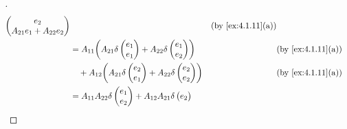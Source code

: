 \begin{proof}[]
\begin{align*}
\begin{pmatrix}
                                                                e_2 \\
                                                                A_{2 1} e_1 + A_{2 2} e_2
                                                              \end{pmatrix}             &  & \text{(by \cref{ex:4.1.11}(a))}                \\
              & = A_{1 1} \pa{A_{2 1} \delta\begin{pmatrix}
                                                e_1 \\
                                                e_1
                                              \end{pmatrix} + A_{2 2} \delta\begin{pmatrix}
                                                                              e_1 \\
                                                                              e_2
                                                                            \end{pmatrix}}             &  & \text{(by \cref{ex:4.1.11}(a))}   \\
              & \quad + A_{1 2} \pa{A_{2 1} \delta\begin{pmatrix}
                                                      e_2 \\
                                                      e_1
                                                    \end{pmatrix} + A_{2 2} \delta\begin{pmatrix}
                                                                                    e_2 \\
                                                                                    e_2
                                                                                  \end{pmatrix}}         &  & \text{(by \cref{ex:4.1.11}(a))} \\
              & = A_{1 1} A_{2 2} \delta\begin{pmatrix}
                                          e_1 \\
                                          e_2
                                        \end{pmatrix} + A_{1 2} A_{2 1} \delta\begin{pmatrix}
                                                                                e_2 \\

\end{pmatrix}
\end{align*}
\end{proof}
